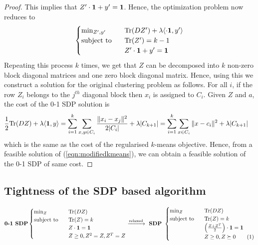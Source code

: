 \begin{proof}
This implies that $Z'\cdot \mathbf 1 + y' = \textbf{1}$. Hence, the optimization problem now reduces to
 \[
    \begin{cases}
		\min_{Z',y'} \enspace &\text{Tr}(DZ') + \lambda\langle \cdot \mathbf 1, y'\rangle\\
		\text{subject to } \enspace &\text{Tr}(Z') = k-1\\
		&Z'\cdot \mathbf 1 + y' = \mathbf 1
	\end{cases}
\]
Repeating this process $k$ times, we get that $Z$ can be decomposed into $k$ non-zero block diagonal matrices and one zero block diagonal matrix. Hence, using this we construct a solution for the original clustering problem as follows. For all $i$, if the row $Z_i$ belongs to the $j^{th}$ diagonal block then $x_i$ is assigned to $C_i$. Given $Z$ and $a$, the cost of the 0-1 SDP solution is
\begin{align*}
\frac{1}{2} \text{Tr}(DZ) + \lambda\langle\mathbf 1, y\rangle &= \sum_{i=1}^k\sum_{x,y \in C_i} \frac{\|x_i-x_j\|^2}{2|C_i|} + \lambda|C_{k+1}| = \sum_{i=1}^k \sum_{x \in C_i} \|x-c_i\|^2 + \lambda |C_{k+1}|
\end{align*}
which is the same as the cost of the regularised $k$-means objective. Hence, from a feasible solution of (\ref{eqn:modifiedkmeans}), we can obtain a feasible solution of the 0-1 SDP of same cost.
\end{proof}

\subsection{Tightness of the SDP based algorithm}
\begin{equation*}
	\textbf{0-1 SDP} 
	\begin{cases}
		\min_{Z} \enspace &\tr(DZ) \\
		\text{subject to } \enspace &\tr(Z) = k\\
		& Z\cdot \mb 1 = \mb 1\\	
		&Z\ge 0, Z^2 = Z, Z^T = Z 
	\end{cases}
	\xrightarrow{\text{relaxed}} \textbf{ SDP } 
	\begin{cases}
		\min_{Z} \enspace &\tr(DZ)\\
        \text{subject to } \enspace &\tr(Z) = k\\
		& \Big(\frac{Z+Z^T}{2}\Big)\cdot \mb 1 = \mb 1\\		
		&Z \ge 0, Z \succeq 0 \numberthis\label{a-eqn:SDP}
	\end{cases}
\end{equation*}

